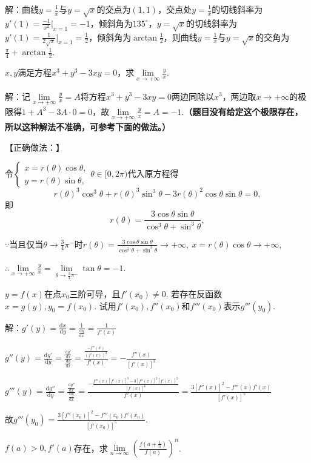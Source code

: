 \documentclass[12pt,UTF8]{ctexart}
\begin{document}
\begin{enumerate}
解：曲线$y=\frac1x$与$y=\sqrt x$的交点为$(1,1)$，交点处$y=\frac1x$的切线斜率为$y'(1)=\frac{-1}{x^2}|_{x=1}=-1$，倾斜角为$135^\circ$，$y=\sqrt x$的切线斜率为$y'(1)=\frac1{2\sqrt x}|_{x=1}=\frac12$，倾斜角为$\arctan\frac12$，则曲线$y=\frac1x$与$y=\sqrt x$的交角为$\frac\pi4+\arctan\frac12$.

$x,y$满足方程$x^3+y^3-3xy=0$，求$\lim\limits_{x\rightarrow+\infty}\frac yx$.

解：记$\lim\limits_{x\rightarrow+\infty}\frac yx=A$将方程$x^3+y^3-3xy=0$两边同除以$x^3$，两边取$x\rightarrow+\infty$的极限得$1+A^3-3A\cdot0=0$，故$\lim\limits_{x\rightarrow+\infty}\frac yx=A=-1$.{\bf（题目没有给定这个极限存在，所以这种解法不准确，可参考下面的做法。）}

【正确做法：】

令$\begin{cases}
x=r(\theta)\cos\theta,\\
y=r(\theta)\sin\theta,
\end{cases}\theta\in[0,2\pi)$代入原方程得
\[r(\theta)^3\cos^3\theta+r(\theta)^3\sin^3\theta-3r(\theta)^2\cos\theta\sin\theta=0,\]即
\[r(\theta)=\frac{3\cos\theta\sin\theta}{\cos^3\theta+\sin^3\theta},\]

$\because$当且仅当$\theta\rightarrow\frac34\pi^-$时$r(\theta)=\frac{3\cos\theta\sin\theta}{\cos^3\theta+\sin^3\theta}\rightarrow+\infty,\ x=r(\theta)\cos\theta\rightarrow+\infty$,

$\therefore\lim\limits_{x\rightarrow+\infty}\frac yx=\lim\limits_{\theta\rightarrow\frac34\pi^-}\tan\theta=-1$.

$y=f(x)$在点$x_0$三阶可导，且$f'(x_0)\neq0$. 若存在反函数$x=g(y),y_0=f(x_0)$. 试用$f'(x_0),f''(x_0)$和$f'''(x_0)$表示$g'''(y_0)$.

解：$g'(y)=\frac{\mathrm dx}{\mathrm dy}=\frac1{\frac{\mathrm dy}{\mathrm dx}}=\frac1{f'(x)}$

$g''(y)=\frac{\mathrm dg'}{\mathrm dy}=\frac{\frac{\mathrm dg'}{\mathrm dx}}{\frac{\mathrm dy}{\mathrm dx}}=\frac{\frac{-f''(x)}{(f'(x))^2}}{f'(x)}=-\frac{f''(x)}{[f'(x)]^3}$

$g'''(y)=\frac{\mathrm dg''}{\mathrm dy}=\frac{\frac{\mathrm dg''}{\mathrm dx}}{\frac{\mathrm dy}{\mathrm dx}}=\frac{-\frac{f'''(x)[f'(x)]^3-3[f''(x)]^2[f'(x)]^2}{[f'(x)]^6}}{f'(x)}=\frac{3[f''(x)]^2-f'''(x)f'(x)}{[f'(x)]^5}$

故$g'''(y_0)=\frac{3[f''(x_0)]^2-f'''(x_0)f'(x_0)}{[f'(x_0)]^5}$.

$f(a)>0,f'(a)$存在，求$\lim\limits_{n\rightarrow\infty}(\frac{f(a+\frac1n)}{f(a)})^n$.


\end{enumerate}
\end{document}
